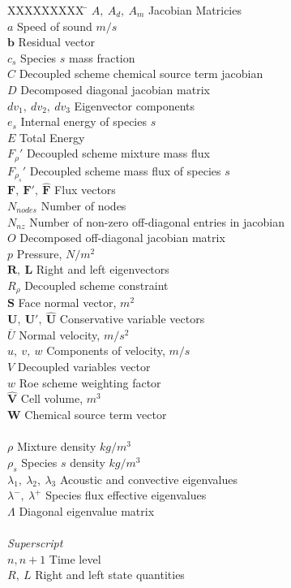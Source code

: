 \documentclass[]{aiaa-tc}%
\begin{document}
\begin{tabbing}
  XXXXXXXXX \= \kill%
  $A,\ A_d,\ A_m$ \> Jacobian Matricies \\
  $a$ \> Speed of sound $m/s$ \\
  $\mathbf{b}$ \> Residual vector \\
  $c_s$ \> Species $s$ mass fraction \\
  $C$ \> Decoupled scheme chemical source term jacobian \\
  $D$ \> Decomposed diagonal jacobian matrix \\
  $dv_1,\ dv_2,\ dv_3$ \> Eigenvector components \\
  $e_s$ \> Internal energy of species $s$ \\
  $E$ \> Total Energy \\
  $F_\rho'$\> Decoupled scheme mixture mass flux \\
  $F_{\rho_s}'$\> Decoupled scheme mass flux of species $s$ \\
  $\mathbf{F},\ \mathbf{F}',\ \mathbf{\hat{F}}$ \> Flux vectors \\
  $N_{nodes}$ \> Number of nodes \\
  $N_{nz}$ \> Number of non-zero off-diagonal entries in jacobian \\
  $O$ \> Decomposed off-diagonal jacobian matrix \\
  $p$ \> Pressure, $N/m^2$ \\
  $\mathbf{R},\ \mathbf{L}$ \> Right and left eigenvectors \\
   $R_\rho$ \> Decoupled scheme constraint \\
  $\mathbf{S}$ \> Face normal vector, $m^2$\\
  $\mathbf{U},\ \mathbf{U}',\ \mathbf{\hat{U}}$ \> Conservative variable vectors \\
  $\overline{U}$ \> Normal velocity, $m/s^2$ \\
  $u,\ v,\ w$ \> Components of velocity, $m/s$ \\
  $V$ \> Decoupled variables vector \\
  $w$ \> Roe scheme weighting factor \\
  $\mathbf{\hat{V}}$ \> Cell volume, $m^3$ \\
   $\mathbf{W}$ \> Chemical source term vector \\
   \\
   $\rho$ \> Mixture density $kg/m^3$ \\
   $\rho_s$ \> Species $s$ density $kg/m^3$ \\
   $\lambda_1,\ \lambda_2,\ \lambda_3$ \> Acoustic and convective eigenvalues \\
    $\lambda^-,\ \lambda^+$ \> Species flux effective eigenvalues \\
    $\Lambda$ \> Diagonal eigenvalue matrix \\
   \\

  \textit{Superscript}\\
  $n, n+1$ \> Time level \\
  $R,\ L$ \> Right and left state quantities \\
 \end{tabbing}
\end{document}
